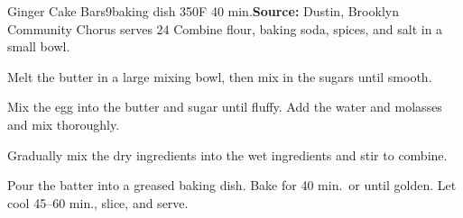 \begin{recipe}{Ginger Cake Bars}{9\inch{}\inch baking dish \hfill 350\0F \hfill 40 min.}{\textbf{Source:} Dustin, Brooklyn Community Chorus \hfill serves 24}
 Combine flour, baking soda, spices, and salt in a small bowl.

 Melt the butter in a large mixing bowl, then mix in the sugars until smooth.

 Mix the egg into the butter and sugar until fluffy. Add the water and molasses and mix thoroughly.

 \newstep Gradually mix the dry ingredients into the wet ingredients and stir to combine.

 \newstep Pour the batter into a greased baking dish. Bake for 40 min.\ or until golden. Let cool 45--60 min., slice, and serve.
\end{recipe}
